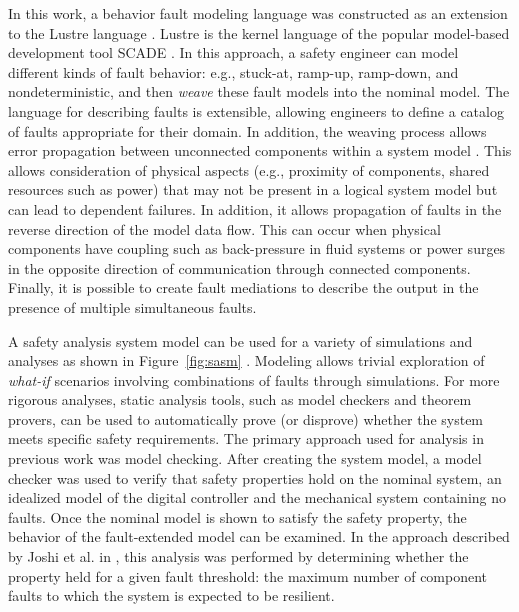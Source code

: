 In this work, a behavior fault modeling language was constructed as an extension to the Lustre language \cite{Halbwachs91:IEEE}. Lustre is the kernel language of the popular model-based development tool SCADE \cite{SCADE}. In this approach, a safety engineer can model different kinds of fault behavior: e.g., stuck-at, ramp-up, ramp-down, and nondeterministic, and then {\em weave} these fault models into the nominal model. The language for describing faults is extensible, allowing engineers to define a catalog of faults appropriate for their domain. In addition, the weaving process allows error propagation between unconnected components within a system model \cite{Joshi07:Hase}. This allows consideration of physical aspects (e.g., proximity of components, shared resources such as power) that may not be present in a logical system model but can lead to dependent failures. In addition, it allows propagation of faults in the reverse direction of the model data flow. This can occur when physical components have coupling such as back-pressure in fluid systems or power surges in the opposite direction of communication through connected components. Finally, it is possible to create fault mediations to describe the output in the presence of multiple simultaneous faults.





A safety analysis system model can be used for a variety of simulations and analyses as shown in Figure~\ref{fig:sasm}  . Modeling allows trivial exploration of \textit{what-if} scenarios involving combinations of faults through simulations. For more rigorous analyses, static analysis tools, such as model checkers and theorem provers, can be used to automatically prove (or disprove) whether the system meets specific safety requirements.
The primary approach used for analysis in previous work was model checking. After creating the system model, a model checker was used to verify that safety properties hold on the nominal system, an idealized model of the digital controller and the mechanical system containing no faults. Once the nominal model is shown to satisfy the safety property, the behavior of the fault-extended model can be examined. In the approach described by Joshi et al. in \cite{Joshi05:Dasc, Joshi05:SafeComp, Joshi07:Hase}, this analysis was performed by determining whether the property held for a given fault threshold: the maximum number of component faults to which the system is expected to be resilient.

